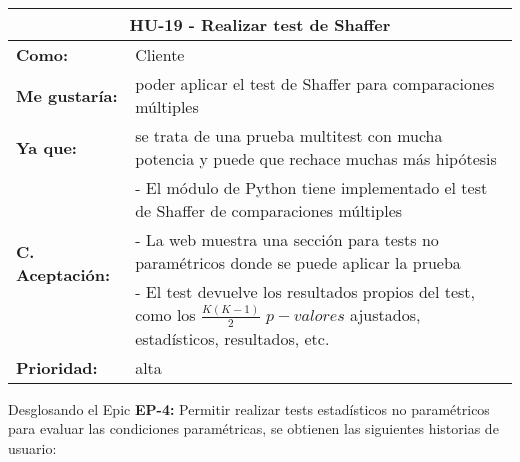 
\begin{table}[H]
	\begin{tabular}{| p{3cm}| p{12cm} |}
		\hline
		\multicolumn{2}{|c|}{\textbf{HU-19} - Realizar test de Shaffer} \\ \hline
		\textbf{Como:} & Cliente \\ \hline
		\textbf{Me gustaría:} & poder aplicar el test de Shaffer para comparaciones múltiples \\ \hline
		\textbf{Ya que:} & se trata de una prueba multitest con mucha potencia y puede que rechace muchas más hipótesis \\ \hline
		\multirow{3}{12cm}{\textbf{C. Aceptación:}} & - El módulo de Python tiene implementado el test de Shaffer de comparaciones múltiples \\
		& - La web muestra una sección para tests no paramétricos donde se puede aplicar la prueba \\
		& - El test devuelve los resultados propios del test, como los $\frac{K(K-1)}{2}$ $p-valores$ ajustados, estadísticos, resultados, etc. \\ \hline
		\textbf{\textbf{Prioridad:}} & alta \\ \hline
	\end{tabular}
\end{table}


Desglosando el Epic \textbf{EP-4:} Permitir realizar tests estadísticos no paramétricos para evaluar las condiciones paramétricas, se obtienen las siguientes historias de usuario:

